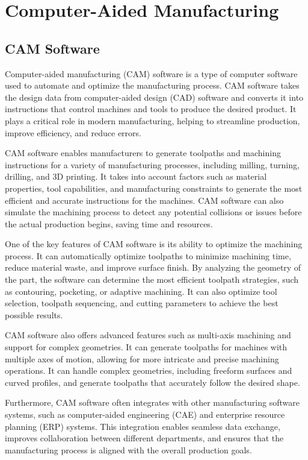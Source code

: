\section{Computer-Aided Manufacturing}\label{CAMmain}
\subsection{CAM Software}
Computer-aided manufacturing (CAM) software is a type of computer software used to automate and optimize the manufacturing process. CAM software takes the design data from computer-aided design (CAD) software and converts it into instructions that control machines and tools to produce the desired product. It plays a critical role in modern manufacturing, helping to streamline production, improve efficiency, and reduce errors.

CAM software enables manufacturers to generate toolpaths and machining instructions for a variety of manufacturing processes, including milling, turning, drilling, and 3D printing. It takes into account factors such as material properties, tool capabilities, and manufacturing constraints to generate the most efficient and accurate instructions for the machines. CAM software can also simulate the machining process to detect any potential collisions or issues before the actual production begins, saving time and resources.

One of the key features of CAM software is its ability to optimize the machining process. It can automatically optimize toolpaths to minimize machining time, reduce material waste, and improve surface finish. By analyzing the geometry of the part, the software can determine the most efficient toolpath strategies, such as contouring, pocketing, or adaptive machining. It can also optimize tool selection, toolpath sequencing, and cutting parameters to achieve the best possible results.

CAM software also offers advanced features such as multi-axis machining and support for complex geometries. It can generate toolpaths for machines with multiple axes of motion, allowing for more intricate and precise machining operations. It can handle complex geometries, including freeform surfaces and curved profiles, and generate toolpaths that accurately follow the desired shape.

Furthermore, CAM software often integrates with other manufacturing software systems, such as computer-aided engineering (CAE) and enterprise resource planning (ERP) systems. This integration enables seamless data exchange, improves collaboration between different departments, and ensures that the manufacturing process is aligned with the overall production goals.

